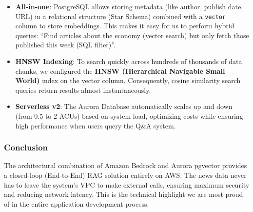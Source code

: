 \begin{itemize}
\tightlist
\item
  \textbf{All-in-one}: PostgreSQL allows storing metadata (like author,
  publish date, URL) in a relational structure (Star Schema) combined
  with a \texttt{vector} column to store embeddings. This makes it easy
  for us to perform hybrid queries: ``Find articles about the economy
  (vector search) but only fetch those published this week (SQL
  filter)''.
\item
  \textbf{HNSW Indexing}: To search quickly across hundreds of thousands
  of data chunks, we configured the \textbf{HNSW (Hierarchical Navigable
  Small World)} index on the vector column. Consequently, cosine
  similarity search queries return results almost instantaneously.
\item
  \textbf{Serverless v2}: The Aurora Database automatically scales up
  and down (from 0.5 to 2 ACUs) based on system load, optimizing costs
  while ensuring high performance when users query the Q\&A system.
\end{itemize}

\hypertarget{conclusion}{%
\subsubsection{Conclusion}}

The architectural combination of Amazon Bedrock and Aurora pgvector
provides a closed-loop (End-to-End) RAG solution entirely on AWS. The
news data never has to leave the system's VPC to make external calls,
ensuring maximum security and reducing network latency. This is the
technical highlight we are most proud of in the entire application
development process.
